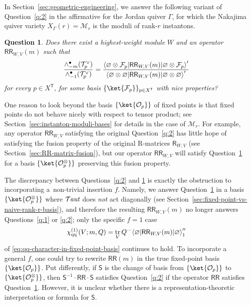 \documentclass[10pt,a4paper]{amsart}
\numberwithin{equation}{section}
\newtheorem{question}[Theorem]{Question}
\newcommand{\cF}{\mathcal{F}}
\newcommand{\cM}{\mathcal{M}}
\newcommand{\cO}{\mathcal{O}}
\newcommand{\cT}{\mathcal{T}}
\newcommand{\kQ}{Q}
\newcommand{\sT}{\mathsf{T}}
\newcommand{\sR}{\mathsf{R}}
\newcommand{\sS}{\mathsf{S}}
\newcommand{\sRR}{\mathsf{RR}}
\newcommand{\chiqq}{\chi_{\mathrm{qq}}}
\DeclareMathOperator{\Taut}{\mathcal{T}\mkern-1.5mu{\mathit{aut}}}
\DeclareMathOperator{\tr}{tr}
\DeclarePairedDelimiter{\inner}{\langle}{\rangle}
\begin{document}
\begin{MyParagraph}
In Section~\ref{sec:geometric-engineering}, we answer the following variant
of Question~\ref{q:2} in the affirmative for the Jordan quiver $\Gamma$,
for which the Nakajima quiver variety $X_\Gamma(r) = \cM_r$ is the moduli
of rank-$r$ instantons.

\begin{question} \label{q:2p}
 Does there exist a highest-weight module $W$ and an operator
 $\sRR_{W,V}(m)$ such that
 \[ \frac{\wedge_{-m}^\bullet(\cT_p^\vee)}{\wedge_{-1}^\bullet(\cT_p^\vee)} = \frac{\inner*{\varnothing \otimes \cF_p | \sRR_{W,V}(m) | \varnothing \otimes \cF_p}'}{\inner*{\varnothing \otimes \varnothing | \sRR_{W,V}(m) | \varnothing \otimes \varnothing}'} \]
 for every $p \in X^{\sT}$, for some basis
 $\{\ket{\cF_p}\}_{p \in X^{\sT}}$ with nice properties?
\end{question}

One reason to look beyond the basis $\{\ket{\cO_p}\}$ of fixed points
is that fixed points do not behave nicely with respect to tensor
product; see Section~\ref{sec:instanton-moduli-bases} for details in the
case of $\cM_r$. For example, any operator $\sRR_{W,V}$ satisfying the
original Question~\ref{q:2} has little hope of satisfying the fusion
property of the original R-matrices $\sR_{W,V}$ (see
Section~\ref{sec:RR-matrix-fusion}), but our operator $\sRR_{W,V}$ will
satisfy Question~\ref{q:2p} for a basis $\{\ket{\cO^{\otimes}_p}\}$
preserving this fusion property.
\end{MyParagraph}

\begin{MyParagraph}
The discrepancy between Questions~\ref{q:2} and \ref{q:2p} is exactly
the obstruction to incorporating a~non-trivial insertion $f$. Namely,
we answer Question~\ref{q:2p} in a basis $\{\ket{\cO_p^\otimes}\}$
where $\Taut$ does {\it not} act diagonally (see
Section~\ref{sec:fixed-point-vs-naive-rank-r-basis}), and therefore the
resulting $\sRR_{W,V}(m)$ no longer answers Questions~\ref{q:1} or
\ref{q:2}; only the specific $f=1$ case
\[ \chiqq^{(1)}(V; m, \kQ) = \tr_V \kQ^{\cdots} \inner*{\varnothing | \sRR_{W,V}(m) | \varnothing}_1'' \]
of \eqref{eq:qq-character-in-fixed-point-basis} continues to hold. To
incorporate a general $f$, one could try to rewrite $\sRR(m)$ in the
true fixed-point basis $\{\ket{\cO_p}\}$. Put differently, if $\sS$ is
the change of basis from $\{\ket{\cO_p}\}$ to
$\{\ket{\cO_p^\otimes}\}$, then $\sS^{-1}\cdot \sRR\cdot \sS$
satisfies Question~\ref{q:2} if the operator $\sRR$ satisfies
Question~\ref{q:2p}. However, it is unclear whether there is a
representation-theoretic interpretation or formula for $\sS$.
\end{MyParagraph}
\end{document}
